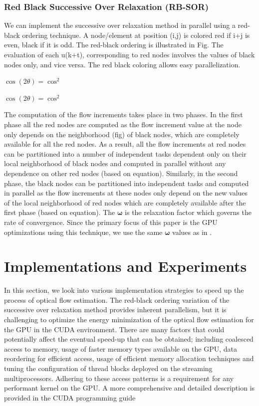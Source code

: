 \documentclass[english]{article}
\begin{document}
	\subsubsection{Red Black Successive Over Relaxation (RB-SOR)}
	We can implement the successive over relaxation method in parallel using a red-black ordering technique. A node/element at position (i,j) is colored red if i+j is even, black if it is odd. The red-black ordering is illustrated in Fig. The evaluation of each u(k+t), corresponding to red nodes involves the values of black nodes only, and vice versa. The red black coloring allows easy parallelization. \newline

	\begin{center}
	$\cos (2\theta) = \cos^2$
	\end{center}	

	\begin{center}
	$\cos (2\theta) = \cos^2$
	\end{center}	

	\noindent The computation of the flow increments takes place in two phases. In the first phase all the red nodes are computed as the flow increment value at the node only depends on the neighborhood (fig) of black nodes, which are completely available for all the red nodes. As a result, all the flow increments at red nodes can be partitioned into a number of independent tasks dependent only on their local neighborhood of black nodes and computed in parallel without any dependence on other red nodes (based on equation). Similarly, in the second phase, the black nodes can be partitioned into independent tasks and computed in parallel as the flow increments at these nodes only depend on the new values of the local neighborhood of red nodes which are completely available after the first phase (based on equation). The $\boldsymbol{\omega}$ is the relaxation factor which governs the rate of convergence. Since the primary focus of this paper is the GPU optimizations using this technique, we use the same $\boldsymbol{\omega}$ values as in \cite{1}.

	\section{Implementations and Experiments}
	In this section, we look into various implementation strategies to speed up the process of optical flow estimation. The red-black ordering variation of the successive over relaxation method provides inherent parallelism, but it is challenging to optimize the energy minimization of the optical flow estimation for the GPU in the CUDA environment. There are many factors that could potentially affect the eventual speed-up that can be obtained; including coalesced access to memory, usage of faster memory types available on the GPU, data reordering for efficient access, usage of efficient memory allocation techniques and tuning the configuration of thread blocks deployed on the streaming multiprocessors. Adhering to these access patterns is a requirement for any performant kernel on the GPU. A more comprehensive and detailed description is provided in the CUDA programming guide \cite{11} 
\end{document}
